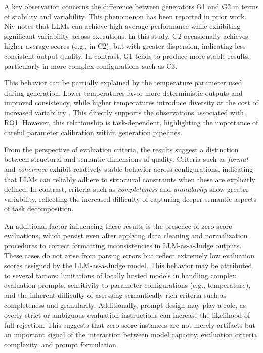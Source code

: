 \documentclass[pdflatex,sn-mathphys-num]{sn-jnl}
\theoremstyle{thmstyleone}%
\theoremstyle{thmstyletwo}%
\theoremstyle{thmstylethree}%
\begin{document}
A key observation concerns the difference between generators G1 and G2 in terms of stability and variability. This phenomenon has been reported in prior work. Niv \cite{hematt2025} notes that LLMs can achieve high average performance while exhibiting significant variability across executions. In this study, G2 occasionally achieves higher average scores (e.g., in C2), but with greater dispersion, indicating less consistent output quality. In contrast, G1 tends to produce more stable results, particularly in more complex configurations such as C3.

This behavior can be partially explained by the temperature parameter used during generation. Lower temperatures favor more deterministic outputs and improved consistency, while higher temperatures introduce diversity at the cost of increased variability \cite{li2026temp}. This directly supports the observations associated with RQ1. However, this relationship is task-dependent, highlighting the importance of careful parameter calibration within generation pipelines.

From the perspective of evaluation criteria, the results suggest a distinction between structural and semantic dimensions of quality. Criteria such as \textit{format} and \textit{coherence} exhibit relatively stable behavior across configurations, indicating that LLMs can reliably adhere to structural constraints when these are explicitly defined. In contrast, criteria such as \textit{completeness} and \textit{granularity} show greater variability, reflecting the increased difficulty of capturing deeper semantic aspects of task decomposition.

An additional factor influencing these results is the presence of zero-score evaluations, which persist even after applying data cleaning and normalization procedures to correct formatting inconsistencies in LLM-as-a-Judge outputs. These cases do not arise from parsing errors but reflect extremely low evaluation scores assigned by the LLM-as-a-Judge model. This behavior may be attributed to several factors: limitations of locally hosted models in handling complex evaluation prompts, sensitivity to parameter configurations (e.g., temperature), and the inherent difficulty of assessing semantically rich criteria such as completeness and granularity. Additionally, prompt design may play a role, as overly strict or ambiguous evaluation instructions can increase the likelihood of full rejection. This suggests that zero-score instances are not merely artifacts but an important signal of the interaction between model capacity, evaluation criteria complexity, and prompt formulation.
\end{document}

